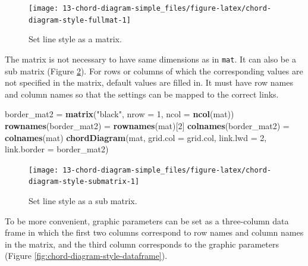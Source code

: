 \documentclass[]{book}
\newenvironment{Shaded}{\begin{snugshade}}{\end{snugshade}}
\newcommand{\KeywordTok}[1]{\textcolor[rgb]{0.13,0.29,0.53}{\textbf{#1}}}
\newcommand{\DataTypeTok}[1]{\textcolor[rgb]{0.13,0.29,0.53}{#1}}
\newcommand{\DecValTok}[1]{\textcolor[rgb]{0.00,0.00,0.81}{#1}}
\newcommand{\StringTok}[1]{\textcolor[rgb]{0.31,0.60,0.02}{#1}}
\newcommand{\NormalTok}[1]{#1}
\begin{document}
\begin{figure}

{\centering \texttt{[image: 13-chord-diagram-simple\_files/figure-latex/chord-diagram-style-fullmat-1]} 

}

\caption{Set line style as a matrix.}\label{fig:chord-diagram-style-fullmat}
\end{figure}

The matrix is not necessary to have same dimensions as in \texttt{mat}.
It can also be a sub matrix (Figure
\ref{fig:chord-diagram-style-submatrix}). For rows or columns of which
the corresponding values are not specified in the matrix, default values
are filled in. It must have row names and column names so that the
settings can be mapped to the correct links.

\begin{Shaded}
\begin{Highlighting}[]
\NormalTok{border_mat2 =}\StringTok{ }\KeywordTok{matrix}\NormalTok{(}\StringTok{"black"}\NormalTok{, }\DataTypeTok{nrow =} \DecValTok{1}\NormalTok{, }\DataTypeTok{ncol =} \KeywordTok{ncol}\NormalTok{(mat))}
\KeywordTok{rownames}\NormalTok{(border_mat2) =}\StringTok{ }\KeywordTok{rownames}\NormalTok{(mat)[}\DecValTok{2}\NormalTok{]}
\KeywordTok{colnames}\NormalTok{(border_mat2) =}\StringTok{ }\KeywordTok{colnames}\NormalTok{(mat)}
\KeywordTok{chordDiagram}\NormalTok{(mat, }\DataTypeTok{grid.col =}\NormalTok{ grid.col, }\DataTypeTok{link.lwd =} \DecValTok{2}\NormalTok{, }\DataTypeTok{link.border =}\NormalTok{ border_mat2)}
\end{Highlighting}
\end{Shaded}

\begin{figure}

{\centering \texttt{[image: 13-chord-diagram-simple\_files/figure-latex/chord-diagram-style-submatrix-1]} 

}

\caption{Set line style as a sub matrix.}\label{fig:chord-diagram-style-submatrix}
\end{figure}

To be more convenient, graphic parameters can be set as a three-column
data frame in which the first two columns correspond to row names and
column names in the matrix, and the third column corresponds to the
graphic parameters (Figure \ref{fig:chord-diagram-style-dataframe}).
\end{document}
